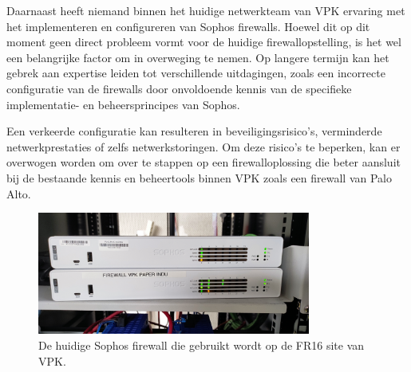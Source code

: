 Daarnaast heeft niemand binnen het huidige netwerkteam van VPK ervaring met het implementeren en configureren van Sophos firewalls. Hoewel dit op dit moment geen direct probleem vormt voor de huidige firewallopstelling, is het wel een belangrijke factor om in overweging te nemen. Op langere termijn kan het gebrek aan expertise leiden tot verschillende uitdagingen, zoals een incorrecte configuratie van de firewalls door onvoldoende kennis van de specifieke implementatie- en beheersprincipes van Sophos.

Een verkeerde configuratie kan resulteren in beveiligingsrisico’s, verminderde netwerkprestaties of zelfs netwerkstoringen. Om deze risico’s te beperken, kan er overwogen worden om over te stappen op een firewalloplossing die beter aansluit bij de bestaande kennis en beheertools binnen VPK zoals een firewall van Palo Alto.\newline

\begin{figure}[H]
    \centering
    \includegraphics[width=0.8\textwidth]{fotos/SophosFirewall.jpg}
    \caption[Sophos Firewall]{\label{fig:grail}De huidige Sophos firewall die gebruikt wordt op de FR16 site van VPK.}
\end{figure} 

